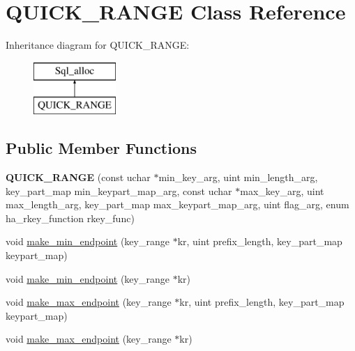 \hypertarget{classQUICK__RANGE}{}\section{Q\+U\+I\+C\+K\+\_\+\+R\+A\+N\+GE Class Reference}
\label{classQUICK__RANGE}
Inheritance diagram for Q\+U\+I\+C\+K\+\_\+\+R\+A\+N\+GE\+:\begin{figure}[H]
\begin{center}
\leavevmode
\includegraphics[height=2.000000cm]{classQUICK__RANGE}
\end{center}
\end{figure}
\subsection*{Public Member Functions}
\begin{DoxyCompactItemize}
\item 
\mbox{\label{classQUICK__RANGE_af3e2f915a9ecac4f288288e2db6776ba}} 
{\bfseries Q\+U\+I\+C\+K\+\_\+\+R\+A\+N\+GE} (const uchar $\ast$min\+\_\+key\+\_\+arg, uint min\+\_\+length\+\_\+arg, key\+\_\+part\+\_\+map min\+\_\+keypart\+\_\+map\+\_\+arg, const uchar $\ast$max\+\_\+key\+\_\+arg, uint max\+\_\+length\+\_\+arg, key\+\_\+part\+\_\+map max\+\_\+keypart\+\_\+map\+\_\+arg, uint flag\+\_\+arg, enum ha\+\_\+rkey\+\_\+function rkey\+\_\+func)
\item 
void \mbox{\hyperlink{classQUICK__RANGE_a3d8f0c6770acd2cf988e63dd1dabd93c}{make\+\_\+min\+\_\+endpoint}} (key\+\_\+range $\ast$kr, uint prefix\+\_\+length, key\+\_\+part\+\_\+map keypart\+\_\+map)
\item 
void \mbox{\hyperlink{classQUICK__RANGE_af87584f85c18f60a01c1c750442e9f8d}{make\+\_\+min\+\_\+endpoint}} (key\+\_\+range $\ast$kr)
\item 
void \mbox{\hyperlink{classQUICK__RANGE_abe2d71de29846d11d5c519e931c6d49d}{make\+\_\+max\+\_\+endpoint}} (key\+\_\+range $\ast$kr, uint prefix\+\_\+length, key\+\_\+part\+\_\+map keypart\+\_\+map)
\item 
void \mbox{\hyperlink{classQUICK__RANGE_a18cd8c97197869b648b256cbe75a6fac}{make\+\_\+max\+\_\+endpoint}} (key\+\_\+range $\ast$kr)
\end{DoxyCompactItemize}
